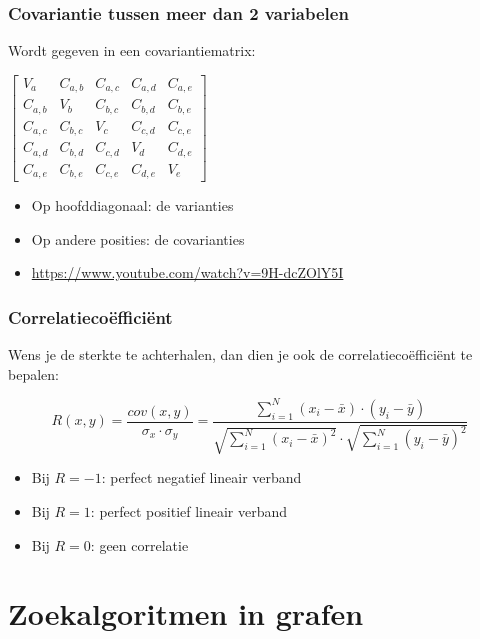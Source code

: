 \documentclass{article}
\begin{document}
\subsubsection{Covariantie tussen meer dan 2 variabelen}

Wordt gegeven in een covariantiematrix:

$\begin{bmatrix}
V_a & C_{a,b} & C_{a,c} & C_{a,d} & C_{a,e}\\
C_{a,b} & V_b & C_{b,c} & C_{b,d} & C_{b,e}\\
C_{a,c} & C_{b,c} & V_c & C_{c,d} & C_{c,e}\\
C_{a,d} & C_{b,d} & C_{c,d} & V_d & C_{d,e}\\
C_{a,e} & C_{b,e} & C_{c,e} & C_{d,e} & V_e
\end{bmatrix}$


\begin{itemize}
    \item Op hoofddiagonaal: de varianties
    \item Op andere posities: de covarianties
    \item \url{https://www.youtube.com/watch?v=9H-dcZOlY5I}
\end{itemize}

\subsubsection{Correlatiecoëfficiënt}

Wens je de sterkte te achterhalen, dan dien je ook de correlatiecoëfficiënt te bepalen:

\begin{equation}
    R(x,y) = \frac{cov(x,y)}{\sigma_x \cdot \sigma_y} = \frac{\sum_{i=1}^N (x_i - \bar{x})\cdot (y_i - \bar{y})}{\sqrt{\sum_{i=1}^N (x_i - \bar{x})^2} \cdot \sqrt{\sum_{i=1}^N (y_i - \bar{y})^2}}                            
\end{equation}


\begin{itemize}
    \item Bij $R = -1$: perfect negatief lineair verband
    \item Bij $R = 1$: perfect positief lineair verband
    \item Bij $R = 0$: geen correlatie
\end{itemize}

\section{Zoekalgoritmen in grafen}
\end{document}
